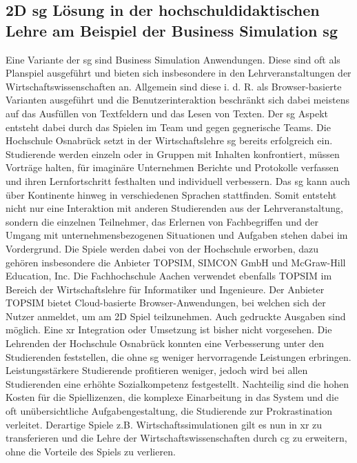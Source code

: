 \documentclass[conference]{IEEEtran}
\begin{document}
\subsection{2D \gls{sg} Lösung in der hochschuldidaktischen Lehre am Beispiel der Business Simulation \gls{sg}}

Eine Variante der \gls{sg} sind Business Simulation Anwendungen.
Diese sind oft als Planspiel ausgeführt und bieten sich insbesondere in den Lehrveranstaltungen der Wirtschaftswissenschaften an.
Allgemein sind diese i. d. R. als Browser-basierte Varianten ausgeführt und die Benutzerinteraktion beschränkt sich dabei meistens auf das Ausfüllen von Textfeldern und das Lesen von Texten\cite{a11}.
Der \gls{sg} Aspekt entsteht dabei durch das Spielen im Team und gegen gegnerische Teams.
Die Hochschule Osnabrück setzt in der Wirtschaftslehre \gls{sg} bereits erfolgreich ein\cite{a3}.
Studierende werden einzeln oder in Gruppen mit Inhalten konfrontiert, müssen Vorträge halten, für imaginäre Unternehmen Berichte und Protokolle verfassen und ihren
Lernfortschritt festhalten und individuell verbessern\cite{a3}.
Das \gls{sg} kann auch über Kontinente hinweg in verschiedenen Sprachen stattfinden. Somit entsteht nicht nur eine Interaktion mit anderen Studierenden aus der Lehrveranstaltung,
sondern die einzelnen Teilnehmer, das Erlernen von Fachbegriffen und der Umgang mit unternehmensbezogenen Situationen und Aufgaben stehen dabei im Vordergrund\cite{a3}.
Die Spiele werden dabei von der Hochschule erworben, dazu gehören insbesondere die Anbieter TOPSIM, SIMCON GmbH und McGraw-Hill Education, Inc\cite{a3}.
Die Fachhochschule Aachen verwendet ebenfalls TOPSIM im Bereich der Wirtschaftslehre für Informatiker und Ingenieure.
Der Anbieter TOPSIM bietet Cloud-basierte Browser-Anwendungen, bei welchen sich der Nutzer anmeldet, um am 2D Spiel teilzunehmen.
Auch gedruckte Ausgaben sind möglich. Eine \gls{xr} Integration oder Umsetzung ist bisher nicht vorgesehen.
Die Lehrenden der Hochschule Osnabrück konnten eine Verbesserung unter den Studierenden feststellen, die ohne \gls{sg} weniger hervorragende Leistungen erbringen.
Leistungsstärkere Studierende profitieren weniger, jedoch wird bei allen Studierenden eine erhöhte Sozialkompetenz festgestellt.
Nachteilig sind die hohen Kosten für die Spiellizenzen, die komplexe Einarbeitung in das System und die oft unübersichtliche Aufgabengestaltung,
die Studierende zur Prokrastination verleitet\cite{a3}.
Derartige Spiele z.B. Wirtschaftssimulationen\cite{a11} gilt es nun in \gls{xr} zu transferieren und die Lehre der Wirtschaftswissenschaften durch \gls{cg} zu erweitern, ohne die Vorteile des Spiels zu verlieren.
\end{document}
